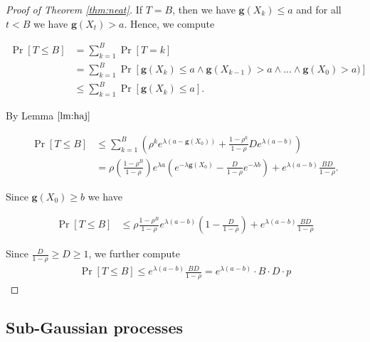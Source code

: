\documentclass[12pt, a4paper]{article}
\newcommand{\gfun}{\mathbf{g}}
\theoremstyle{remark}
\begin{document}
\begin{proof}[Proof of Theorem \ref{thm:neat}]

    If $T = B$, then we have $\gfun(X_k) \leq a$ and for all $t < B$ we have $\gfun(X_t) > a$. Hence, we compute

    \begin{align*}
        \Pr[T \leq B] & = \sum_{k=1}^{B} \Pr[T = k]                                                                        \\
                      & = \sum_{k=1}^{B} \Pr[\gfun(X_k) \leq a \land \gfun(X_{k - 1}) > a \land ... \land \gfun(X_0) > a)] \\
                      & \leq \sum_{k=1}^{B} \Pr[\gfun(X_k) \leq a].
    \end{align*}

    By Lemma $\ref{lm:haj}$

    \begin{align*}
        \Pr[T \leq B] & \leq \sum_{k=1}^{B} \left(\rho^k e^{\lambda(a - \gfun(X_0))} + \frac{1 - \rho^k}{1 - \rho} D e^{\lambda(a - b)}\right)                                                          \\
                      & = \rho \left(\frac{1 - \rho^B}{1 - \rho}\right) e^{\lambda a}\left(e^{-\lambda\gfun(X_0)} - \frac{D}{1 - \rho} e^{-\lambda b}\right) + e^{\lambda(a - b)} \frac{B D}{1 - \rho}.
    \end{align*}

    Since $\gfun(X_0) \ge b$ we have

    \begin{align*}
        \Pr[T \leq B] & \leq \rho \frac{1 - \rho^B}{1 - \rho} e^{\lambda (a - b)}\left(1 - \frac{D}{1 - \rho}\right) + e^{\lambda(a - b)} \frac{B D}{1 - \rho}
    \end{align*}

    Since $\frac{D}{1 - \rho} \geq D \geq 1 $, we further compute
    \begin{align*}
        \Pr[T \leq B] \leq e^{\lambda(a - b)} \frac{B D}{1 - \rho} = e^{\lambda(a - b)} \cdot B \cdot D \cdot p
    \end{align*}

\end{proof}
\subsection{Sub-Gaussian processes}
\end{document}
